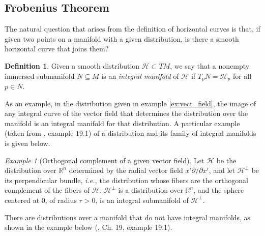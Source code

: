 \documentclass[12pt, letterpaper, reqno]{amsart}
\theoremstyle{definition}
\newtheorem{df}{Definition}
\theoremstyle{plain}
\theoremstyle{remark}
\newtheorem{ex}{Example}
\begin{document}
\subsection{Frobenius Theorem}%
\label{sub:frobenius_theorem}


The natural question that arises from the definition of horizontal curves is that, if given two points on a manifold with a given distribution, is there a smooth horizontal curve that joins them? 

\begin{df}
	Given a smooth distribution $ \mathcal{H} \subset TM$, we say that a nonempty immersed submanifold $ N\subseteq M $  is an \textit{integral manifold} of $\mathcal{H}$ if $ T_p N = \mathcal{H}_p $ for all $ p\in N $.
\end{df}
 As an example, in the distribution given in example \ref{ex:vect_field}, the image of any integral curve of the vector field that determines the distribution over the manifold is an integral manifold for that distribution. A particular example (taken from \cite{lee2003introduction}, example 19.1) of a distribution and its family of integral manifolds is given below.

\begin{ex}[Orthogonal complement of a given vector field]
Let $ \mathcal{H} $ be the distribution over $ \mathbb{R}^n $ determined by the radial vector field $ x^i \partial / \partial x^i $, and let $ \mathcal{H}^\perp $ be its perpendicular bundle, \textit{i.e.,} the distribution whose fibers are the orthogonal complement of the fibers of $ \mathcal{H}. $ $ \mathcal{H}^\perp $ is a distribution over $ \mathbb{R}^n  $, and the sphere centered at $0$, of radius $r>0$, is an integral submanifold of $ \mathcal{H}^\perp. $        
\end{ex}

There are distributions over a manifold that do not have integral manifolds, as shown in the example below (\cite{lee2003introduction}, Ch. 19, example 19.1).
\end{document}
